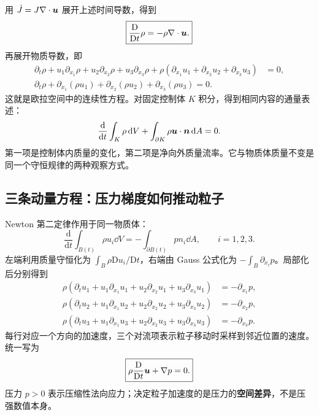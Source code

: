 用 $\dot J=J\nabla\cdot\bm{u}$ 展开上述时间导数，得到
\begin{equation}
 \boxed{\frac{\mathrm D}{\mathrm Dt}\rho=-\rho\nabla\cdot\bm{u}.}\label{eq:euler-mass-primitive}
\end{equation}
再展开物质导数，即
\begin{align}
 \partial_t\rho+u_1\partial_{x_1}\rho+u_2\partial_{x_2}\rho
 +u_3\partial_{x_3}\rho
 +\rho(\partial_{x_1}u_1+\partial_{x_2}u_2+\partial_{x_3}u_3)&=0,\\
 \boxed{\partial_t\rho+\partial_{x_1}(\rho u_1)
 +\partial_{x_2}(\rho u_2)+\partial_{x_3}(\rho u_3)=0.}&
 \label{eq:euler-mass-detail}
\end{align}
这就是欧拉空间中的连续性方程。对固定控制体 $K$ 积分，得到相同内容的通量表述：
\begin{equation}
 \frac{\mathrm d}{\mathrm dt}\int_K\rho\,\mathrm d V
 +\int_{\partial K}\rho\bm{u}\cdot\bm{n}\,\mathrm d A=0.
 \label{eq:euler-mass-integral}
\end{equation}
第一项是控制体内质量的变化，第二项是净向外质量流率。它与物质体质量不变是同一个守恒规律的两种观察方式。

\subsection{三条动量方程：压力梯度如何推动粒子}

Newton 第二定律作用于同一物质体：
\begin{equation}
 \frac{\mathrm d}{\mathrm dt}\int_{B(t)}\rho u_i\dd V
 =-\int_{\partial B(t)}p n_i\dd A,
 \qquad i=1,2,3.
\end{equation}
左端利用质量守恒化为 $\int_B\rho\mathrm Du_i/\mathrm Dt$，右端由 Gauss 公式化为 $-\int_B\partial_{x_i}p$。局部化后分别得到
\begin{align}
 \rho(\partial_tu_1+u_1\partial_{x_1}u_1+u_2\partial_{x_2}u_1+u_3\partial_{x_3}u_1)&=-\partial_{x_1}p,\\
 \rho(\partial_tu_2+u_1\partial_{x_1}u_2+u_2\partial_{x_2}u_2+u_3\partial_{x_3}u_2)&=-\partial_{x_2}p,\\
 \rho(\partial_tu_3+u_1\partial_{x_1}u_3+u_2\partial_{x_2}u_3+u_3\partial_{x_3}u_3)&=-\partial_{x_3}p.
\end{align}
每行对应一个方向的加速度，三个对流项表示粒子移动时采样到邻近位置的速度。统一写为
\begin{equation}
 \boxed{\rho\frac{\mathrm D}{\mathrm Dt}\bm{u}+\nabla p=0.}\label{eq:euler-momentum-primitive}
\end{equation}
压力 $p>0$ 表示压缩性法向应力；决定粒子加速度的是压力的\textbf{空间差异}，不是压强数值本身。

